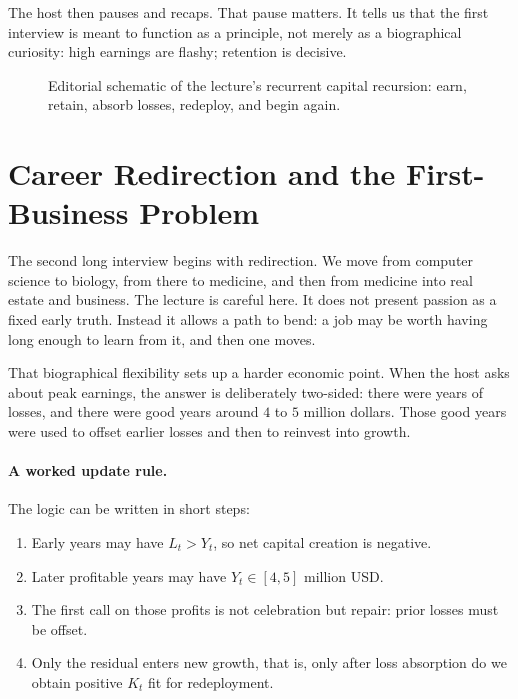 The host then pauses and recaps. That pause matters. It tells us that the first interview is meant to function as a principle, not merely as a biographical curiosity: high earnings are flashy; retention is decisive.

\begin{figure}
\centering
{}
\caption{Editorial schematic of the lecture's recurrent capital recursion: earn, retain, absorb losses, redeploy, and begin again.}
\end{figure}

\section{Career Redirection and the First-Business Problem}

The second long interview begins with redirection. We move from computer science to biology, from there to medicine, and then from medicine into real estate and business. The lecture is careful here. It does not present passion as a fixed early truth. Instead it allows a path to bend: a job may be worth having long enough to learn from it, and then one moves.

That biographical flexibility sets up a harder economic point. When the host asks about peak earnings, the answer is deliberately two-sided: there were years of losses, and there were good years around \(4\) to \(5\) million dollars. Those good years were used to offset earlier losses and then to reinvest into growth.

\paragraph{A worked update rule.} The logic can be written in short steps:
\begin{enumerate}
\item Early years may have \(L_t>Y_t\), so net capital creation is negative.
\item Later profitable years may have \(Y_t\in [4,5]\) million USD.
\item The first call on those profits is not celebration but repair: prior losses must be offset.
\item Only the residual enters new growth, that is, only after loss absorption do we obtain positive \(K_t\) fit for redeployment.
\end{enumerate}

